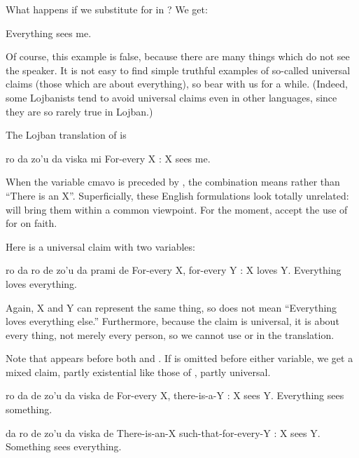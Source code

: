 What happens if we substitute  for
     in ? We get:
\begin{example}
Everything sees me.
\end{example}

Of course, this example is false, because there are many things
    which do not see the speaker. It is not easy to find simple
    truthful examples of so-called universal claims (those which
    are about everything), so bear with us for a while. (Indeed,
    some Lojbanists tend to avoid universal claims even in other
    languages, since they are so rarely true in Lojban.) 

The Lojban translation of 
    is
\begin{example}
ro da zo'u da viska mi\n
For-every X : X sees me.
\end{example}

When the variable cmavo  is preceded by , the
    combination means  rather than ``There is an
    X''. Superficially, these English formulations look totally
    unrelated:  will bring them within a
    common viewpoint. For the moment, accept the use of 
    for  on faith. 

Here is a universal claim with two variables:
\begin{example}
ro da ro de zo'u da prami de\n
For-every X, for-every Y : X loves Y.\n
Everything loves everything.
\end{example}

Again, X and Y can represent the same thing, so  does not mean ``Everything loves
    everything else.'' Furthermore, because the claim is universal,
    it is about every thing, not merely every person, so we cannot
    use  or  in the translation.

Note that  appears before both  and . If
     is omitted before either variable, we get a mixed claim,
    partly existential like those of ,
    partly universal.
\begin{example}
ro da de zo'u da viska de\n
For-every X, there-is-a-Y : X sees Y.\n
Everything sees something.
\end{example}

\begin{example}
da ro de zo'u da viska de\n
There-is-an-X such-that-for-every-Y : X sees Y.\n
Something sees everything.
\end{example}

